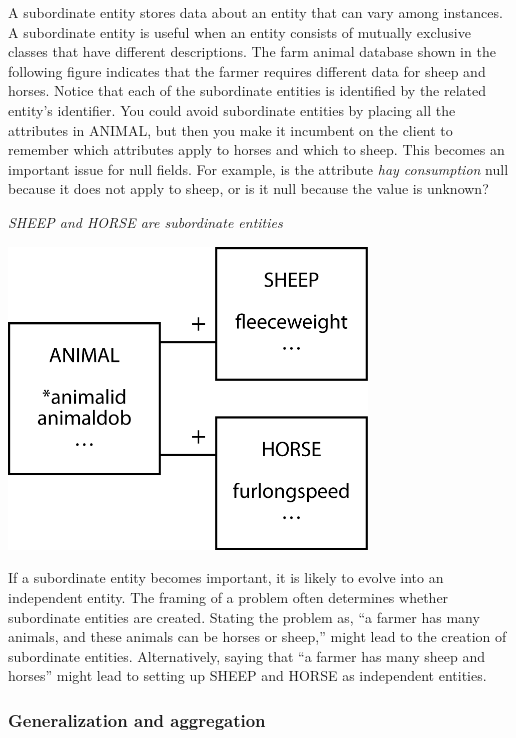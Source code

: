 \documentclass[
]{article}
\begin{document}
A subordinate entity stores data about an entity that can vary among
instances. A subordinate entity is useful when an entity consists of
mutually exclusive classes that have different descriptions. The farm
animal database shown in the following figure indicates that the farmer
requires different data for sheep and horses. Notice that each of the
subordinate entities is identified by the related entity's identifier.
You could avoid subordinate entities by placing all the attributes in
ANIMAL, but then you make it incumbent on the client to remember which
attributes apply to horses and which to sheep. This becomes an important
issue for null fields. For example, is the attribute \emph{hay consumption}
null because it does not apply to sheep, or is it null because the value
is unknown?

\emph{SHEEP and HORSE are subordinate entities}

\includegraphics[width=3.75in,height=\textheight]{Figures/Chapter 7/animal.png}

If a subordinate entity becomes important, it is likely to evolve into
an independent entity. The framing of a problem often determines whether
subordinate entities are created. Stating the problem as, ``a farmer has
many animals, and these animals can be horses or sheep,'' might lead to
the creation of subordinate entities. Alternatively, saying that ``a
farmer has many sheep and horses'' might lead to setting up SHEEP and
HORSE as independent entities.

\hypertarget{generalization-and-aggregation}{%
\subsubsection*{Generalization and aggregation}\label{generalization-and-aggregation}}
\end{document}
